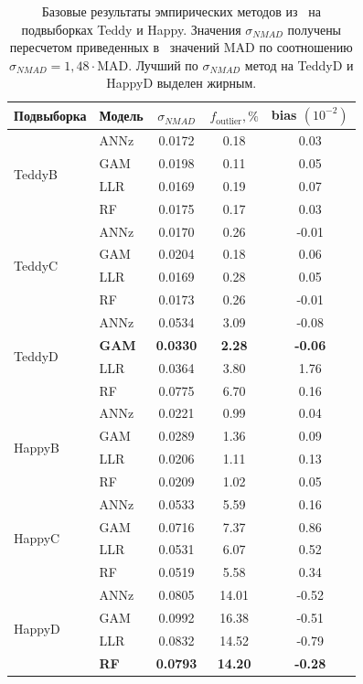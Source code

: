 \documentclass[12pt,a4paper]{article}
\begin{document}
\begin{table}[htbp]
\centering
\caption{Базовые результаты эмпирических методов из~\cite{beck2017} на подвыборках Teddy и Happy. Значения $\sigma_{NMAD}$ получены пересчетом приведенных в~\cite{beck2017} значений MAD по соотношению $\sigma_{NMAD} = 1{,}48 \cdot \mathrm{MAD}$. Лучший по $\sigma_{NMAD}$ метод на TeddyD и HappyD выделен жирным.}
\label{tab:beck2017-baselines}
\small
\begin{tabular}{|l|l|c|c|c|}
\hline
Подвыборка & Модель & $\sigma_{NMAD}$ & $f_{\mathrm{outlier}}, \%$ & bias $(10^{-2})$ \\
\hline
\multirow{4}{*}{TeddyB} & ANNz & 0.0172 & 0.18 & 0.03 \\
 & GAM & 0.0198 & 0.11 & 0.05 \\
 & LLR & 0.0169 & 0.19 & 0.07 \\
 & RF & 0.0175 & 0.17 & 0.03 \\
\hline
\multirow{4}{*}{TeddyC} & ANNz & 0.0170 & 0.26 & -0.01 \\
 & GAM & 0.0204 & 0.18 & 0.06 \\
 & LLR & 0.0169 & 0.28 & 0.05 \\
 & RF & 0.0173 & 0.26 & -0.01 \\
\hline
\multirow{4}{*}{TeddyD} & ANNz & 0.0534 & 3.09 & -0.08 \\
 & \textbf{GAM} & \textbf{0.0330} & \textbf{2.28} & \textbf{-0.06} \\
 & LLR & 0.0364 & 3.80 & 1.76 \\
 & RF & 0.0775 & 6.70 & 0.16 \\
\hline
\multirow{4}{*}{HappyB} & ANNz & 0.0221 & 0.99 & 0.04 \\
 & GAM & 0.0289 & 1.36 & 0.09 \\
 & LLR & 0.0206 & 1.11 & 0.13 \\
 & RF & 0.0209 & 1.02 & 0.05 \\
\hline
\multirow{4}{*}{HappyC} & ANNz & 0.0533 & 5.59 & 0.16 \\
 & GAM & 0.0716 & 7.37 & 0.86 \\
 & LLR & 0.0531 & 6.07 & 0.52 \\
 & RF & 0.0519 & 5.58 & 0.34 \\
\hline
\multirow{4}{*}{HappyD} & ANNz & 0.0805 & 14.01 & -0.52 \\
 & GAM & 0.0992 & 16.38 & -0.51 \\
 & LLR & 0.0832 & 14.52 & -0.79 \\
 & \textbf{RF} & \textbf{0.0793} & \textbf{14.20} & \textbf{-0.28} \\
\hline
\end{tabular}
\end{table}
\end{document}
